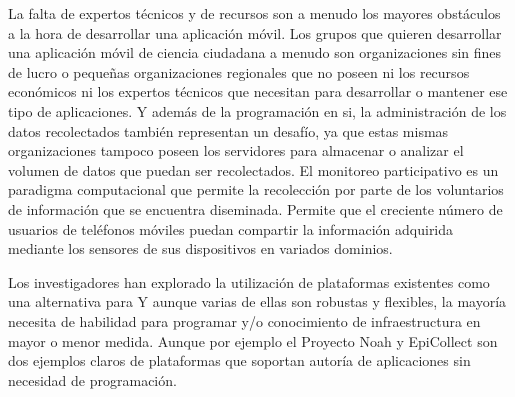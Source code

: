 	La falta de expertos técnicos y de recursos son a menudo los mayores obstáculos a la hora de desarrollar una aplicación móvil. Los grupos que quieren desarrollar una aplicación móvil de ciencia ciudadana a menudo son organizaciones sin fines de lucro o pequeñas organizaciones regionales que no poseen ni los recursos económicos ni los expertos técnicos que necesitan para desarrollar o mantener ese tipo de aplicaciones. Y además de la programación en si, la administración de los datos recolectados también representan un desafío, ya que estas mismas organizaciones tampoco poseen los servidores para almacenar o analizar el volumen de datos que puedan ser recolectados. El monitoreo participativo es un paradigma computacional que permite la recolección por parte de los voluntarios de información que se encuentra diseminada. Permite que el creciente número de usuarios de teléfonos móviles puedan compartir la información adquirida mediante los sensores de sus dispositivos en variados dominios. 
	
	Los investigadores han explorado la utilización de plataformas existentes como una alternativa para Y aunque varias de ellas son robustas y flexibles, la mayoría necesita de habilidad para programar y/o conocimiento de infraestructura en mayor o menor medida. Aunque por ejemplo el Proyecto Noah y EpiCollect son dos ejemplos claros de plataformas que soportan autoría de aplicaciones sin necesidad de programación. \cite{kim2013sensr}